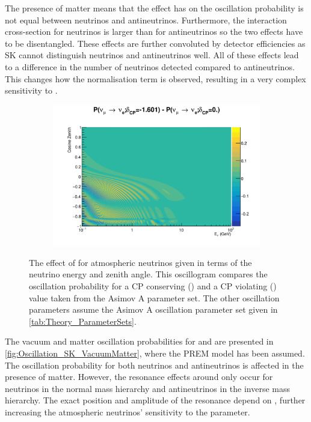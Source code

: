 The presence of matter means that the effect  has on the oscillation probability is not equal between neutrinos and antineutrinos. Furthermore, the interaction cross-section for neutrinos is larger than for antineutrinos so the two effects have to be disentangled. These effects are further convoluted by detector efficiencies as SK cannot distinguish neutrinos and antineutrinos well. All of these effects lead to a difference in the number of neutrinos detected compared to antineutrinos. This changes how the  normalisation term is observed, resulting in a very complex sensitivity to .

\begin{figure}[h]
  \begin{subfigure}[t]{\textwidth}
    \includegraphics[width=\textwidth, trim={0mm 0mm 0mm 0mm}, clip,page=1]{Figures/Oscillation/AtmDCPSens.pdf}
  \end{subfigure}
  \caption{The effect of  for atmospheric neutrinos given in terms of the neutrino energy and zenith angle. This oscillogram compares the  oscillation probability for a CP conserving () and a CP violating () value taken from the Asimov A parameter set. The other oscillation parameters assume the Asimov A oscillation parameter set given in \autoref{tab:Theory_ParameterSets}.}
  \label{fig:Oscillation_SK_DCPSensitivity}
\end{figure}

The vacuum and matter oscillation probabilities for  and  are presented in \autoref{fig:Oscillation_SK_VacuumMatter}, where the PREM model has been assumed. The oscillation probability for both neutrinos and antineutrinos is affected in the presence of matter. However, the resonance effects around  only occur for neutrinos in the normal mass hierarchy and antineutrinos in the inverse mass hierarchy. The exact position and amplitude of the resonance depend on , further increasing the atmospheric neutrinos' sensitivity to the parameter.

